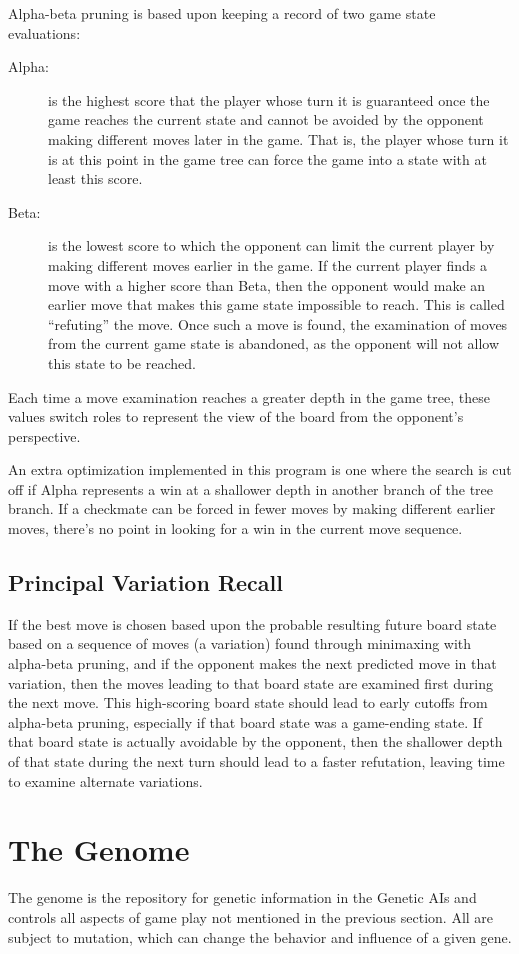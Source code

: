 \documentclass[letterpaper]{article}
\renewcommand{\_}{\allowbreak\textunderscore\allowbreak}
\begin{document}
Alpha-beta pruning is based upon keeping a record of two game state evaluations:
\begin{description}
	\item[Alpha:] is the highest score that the player whose turn it is guaranteed once the game reaches the current state and cannot be avoided by the opponent making different moves later in the game. That is, the player whose turn it is at this point in the game tree can force the game into a state with at least this score.
	\item[Beta:] is the lowest score to which the opponent can limit the current player by making different moves earlier in the game. If the current player finds a move with a higher score than Beta, then the opponent would make an earlier move that makes this game state impossible to reach. This is called ``refuting'' the move. Once such a move is found, the examination of moves from the current game state is abandoned, as the opponent will not allow this state to be reached.
\end{description}
Each time a move examination reaches a greater depth in the game tree, these values switch roles to represent the view of the board from the opponent's perspective.

An extra optimization implemented in this program is one where the search is cut off if Alpha represents a win at a shallower depth in another branch of the tree branch. If a checkmate can be forced in fewer moves by making different earlier moves, there's no point in looking for a win in the current move sequence.

\subsection{Principal Variation Recall}

If the best move is chosen based upon the probable resulting future board state based on a sequence of moves (a variation) found through minimaxing with alpha-beta pruning, and if the opponent makes the next predicted move in that variation, then the moves leading to that board state are examined first during the next move. This high-scoring board state should lead to early cutoffs from alpha-beta pruning, especially if that board state was a game-ending state. If that board state is actually avoidable by the opponent, then the shallower depth of that state during the next turn should lead to a faster refutation, leaving time to examine alternate variations.


\section{The Genome}
\label{gene-section}
The genome is the repository for genetic information in the Genetic AIs and controls all aspects of game play not mentioned in the previous section. All are subject to mutation, which can change the behavior and influence of a given gene.
\end{document}
